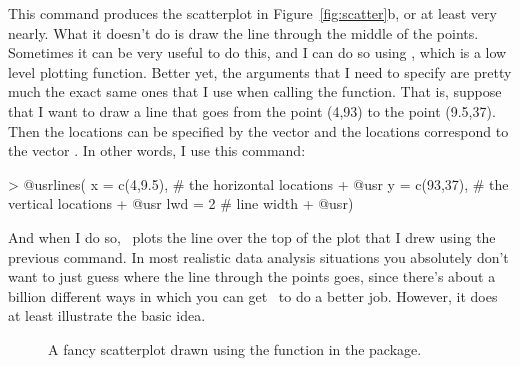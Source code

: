 This command produces the scatterplot in Figure~\ref{fig:scatter}b, or at least very nearly. What it doesn't do is draw the line through the middle of the points. Sometimes it can be very useful to do this, and I can do so using , which is a low level plotting function. Better yet, the arguments that I need to specify are pretty much the exact same ones that I use when calling the  function. That is, suppose that I want to draw a line that goes from the point (4,93) to the point (9.5,37). Then the  locations can be specified by the vector  and the  locations correspond to the vector . In other words, I use this command:
\begin{rblock1}
> @usr{lines( x = c(4,9.5),}   # the horizontal locations
+ @usr{       y = c(93,37),}   # the vertical locations
+ @usr{       lwd = 2}         # line width
+ @usr{)}
\end{rblock1}
And when I do so, \R\ plots the line over the top of the plot that I drew using the previous command. In most realistic data analysis situations you absolutely don't want to just guess where the line through the points goes, since there's about a billion different ways in which you can get \R\ to do a better job. However, it does at least illustrate the basic idea. 


\begin{figure}[t]
\begin{center}
\caption{A fancy scatterplot drawn using the  function in the  package.}
\HR
\label{fig:fancyscatter}
\end{center}
\end{figure}

